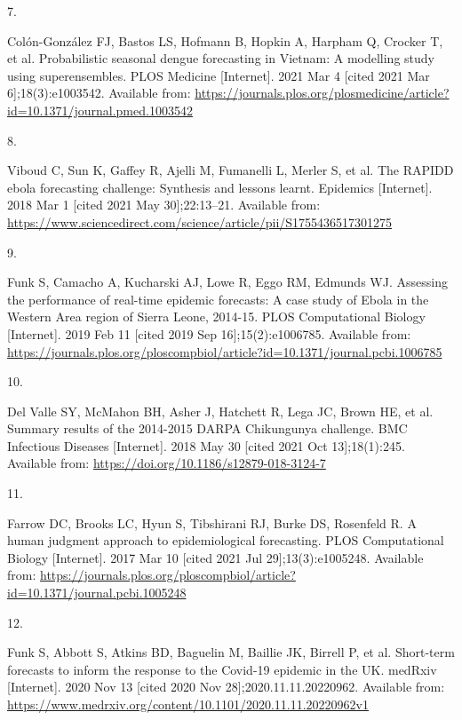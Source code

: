 \documentclass[
]{article}
\newlength{\cslhangindent}
\newlength{\csllabelwidth}
\newlength{\cslentryspacingunit} %
\newenvironment{CSLReferences}[2] %
 {%
  \setlength{\parindent}{0pt}
  \ifodd #1
  \let\oldpar\par
  \def\par{\hangindent=\cslhangindent\oldpar}
  \fi
  \setlength{\parskip}{#2\cslentryspacingunit}
 }%
 {}
\newcommand{\CSLLeftMargin}[1]{\parbox[t]{\csllabelwidth}{#1}}
\newcommand{\CSLRightInline}[1]{\parbox[t]{\linewidth - \csllabelwidth}{#1}\break}
\begin{document}
\begin{CSLReferences}{0}{0}
\leavevmode{}%
\CSLLeftMargin{7. }
\CSLRightInline{Colón-González FJ, Bastos LS, Hofmann B, Hopkin A, Harpham Q, Crocker T, et al. Probabilistic seasonal dengue forecasting in {Vietnam}: {A} modelling study using superensembles. PLOS Medicine {[}Internet{]}. 2021 Mar 4 {[}cited 2021 Mar 6{]};18(3):e1003542. Available from: \url{https://journals.plos.org/plosmedicine/article?id=10.1371/journal.pmed.1003542}}

\leavevmode{}%
\CSLLeftMargin{8. }
\CSLRightInline{Viboud C, Sun K, Gaffey R, Ajelli M, Fumanelli L, Merler S, et al. The {RAPIDD} ebola forecasting challenge: {Synthesis} and lessons learnt. Epidemics {[}Internet{]}. 2018 Mar 1 {[}cited 2021 May 30{]};22:13--21. Available from: \url{https://www.sciencedirect.com/science/article/pii/S1755436517301275}}

\leavevmode{}%
\CSLLeftMargin{9. }
\CSLRightInline{Funk S, Camacho A, Kucharski AJ, Lowe R, Eggo RM, Edmunds WJ. Assessing the performance of real-time epidemic forecasts: {A} case study of {Ebola} in the {Western Area} region of {Sierra Leone}, 2014-15. PLOS Computational Biology {[}Internet{]}. 2019 Feb 11 {[}cited 2019 Sep 16{]};15(2):e1006785. Available from: \url{https://journals.plos.org/ploscompbiol/article?id=10.1371/journal.pcbi.1006785}}

\leavevmode{}%
\CSLLeftMargin{10. }
\CSLRightInline{Del Valle SY, McMahon BH, Asher J, Hatchett R, Lega JC, Brown HE, et al. Summary results of the 2014-2015 {DARPA Chikungunya} challenge. BMC Infectious Diseases {[}Internet{]}. 2018 May 30 {[}cited 2021 Oct 13{]};18(1):245. Available from: \url{https://doi.org/10.1186/s12879-018-3124-7}}

\leavevmode{}%
\CSLLeftMargin{11. }
\CSLRightInline{Farrow DC, Brooks LC, Hyun S, Tibshirani RJ, Burke DS, Rosenfeld R. A human judgment approach to epidemiological forecasting. PLOS Computational Biology {[}Internet{]}. 2017 Mar 10 {[}cited 2021 Jul 29{]};13(3):e1005248. Available from: \url{https://journals.plos.org/ploscompbiol/article?id=10.1371/journal.pcbi.1005248}}

\leavevmode{}%
\CSLLeftMargin{12. }
\CSLRightInline{Funk S, Abbott S, Atkins BD, Baguelin M, Baillie JK, Birrell P, et al. Short-term forecasts to inform the response to the {Covid-19} epidemic in the {UK}. medRxiv {[}Internet{]}. 2020 Nov 13 {[}cited 2020 Nov 28{]};2020.11.11.20220962. Available from: \url{https://www.medrxiv.org/content/10.1101/2020.11.11.20220962v1}}


\end{CSLReferences}
\end{document}
